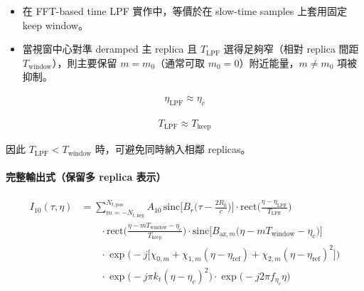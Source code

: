 \documentclass[11pt]{article}
\providecommand{\tightlist}{%
  \setlength{\itemsep}{0pt}\setlength{\parskip}{0pt}}
\begin{document}
\begin{itemize}
\tightlist
\item
  在 FFT-based time LPF 實作中，等價於在 slow-time samples 上套用固定
  keep window。
\item
  當視窗中心對準 deramped 主 replica 且 \(T_{\mathrm{LPF}}\)
  選得足夠窄（相對 replica 間距 \(T_{\mathrm{window}}\)），則主要保留
  \(m=m_0\)（通常可取 \(m_0=0\)）附近能量，\(m\neq m_0\) 項被抑制。
\end{itemize}

\begin{equation}
\begin{aligned}
\eta_{\mathrm{LPF}} \approx \eta_c
\end{aligned}
\end{equation}

\begin{equation}
\begin{aligned}
T_{\mathrm{LPF}} \approx T_{\mathrm{keep}}
\end{aligned}
\end{equation}

因此 \(T_{\mathrm{LPF}} < T_{\mathrm{window}}\) 時，可避免同時納入相鄰
replicas。

\hypertarget{ux5b8cux6574ux8f38ux51faux5f0fux4fddux7559ux591a-replica-ux8868ux793a}{%
\paragraph{完整輸出式（保留多 replica
表示）}\label{ux5b8cux6574ux8f38ux51faux5f0fux4fddux7559ux591a-replica-ux8868ux793a}}

\begin{equation}
\begin{aligned}
I_{10}(\tau,\eta)
&=
\sum_{m=-N_{t,\mathrm{neg}}}^{N_{t,\mathrm{pos}}} A_{10}\,
\mathrm{sinc}\biggl[ B_r\biggl( \tau-\frac{2R_0}{c} \biggr) \biggr]
\cdot \mathrm{rect}\biggl( \frac{\eta-\eta_{\mathrm{LPF}}}{T_{\mathrm{LPF}}} \biggr)\\
&\qquad \cdot \mathrm{rect}\biggl( \frac{\eta-mT_{\mathrm{window}}-\eta_c}{T_{\mathrm{keep}}} \biggr)
\cdot \mathrm{sinc}\biggl[ B_{\mathrm{az},m}\biggl( \eta-mT_{\mathrm{window}}-\eta_c \biggr) \biggr]\\
&\qquad \cdot \exp\biggl( -j\biggl[ \chi_{0,m}+\chi_{1,m}(\eta-\eta_{\mathrm{ref}})
+\chi_{2,m}(\eta-\eta_{\mathrm{ref}})^2 \biggr] \biggr)\\
&\qquad \cdot \exp\biggl( -j\pi k_t(\eta-\eta_c)^2 \biggr)
\cdot \exp\biggl( -j2\pi f_{\eta_c}\eta \biggr)
\end{aligned}
\end{equation}
\end{document}
